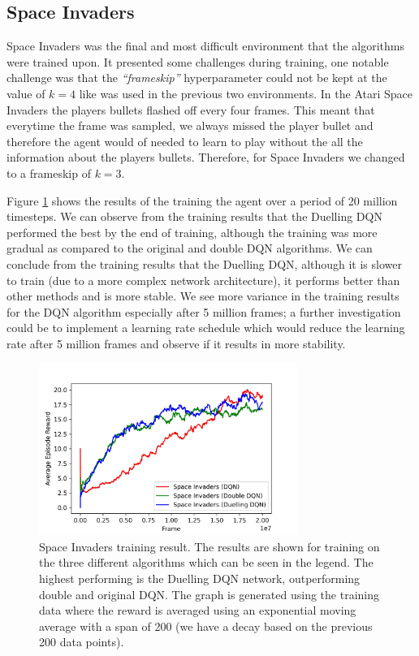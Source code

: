 \subsection{Space Invaders}
Space Invaders was the final and most difficult environment that the algorithms were trained upon. It presented some challenges during training, one notable challenge was that the \textit{``frameskip''} hyperparameter could not be kept at the value of $k = 4$ like was used in the previous two environments. In the Atari Space Invaders the players bullets flashed off every four frames. This meant that everytime the frame was sampled, we always missed the player bullet and therefore the agent would of needed to learn to play without the all the information about the players bullets. Therefore, for Space Invaders we changed to a frameskip of $k = 3$.

Figure \ref{fig:si-train-results} shows the results of the training the agent over a period of 20 million timesteps. We can observe from the training results that the Duelling DQN performed the best by the end of training, although the training was more gradual as compared to the original and double DQN algorithms. We can conclude from the training results that the Duelling DQN, although it is slower to train (due to a more complex network architecture), it performs better than other methods and is more stable. We see more variance in the training results for the DQN algorithm especially after 5 million frames; a further investigation could be to implement a learning rate schedule which would reduce the learning rate after 5 million frames and observe if it results in more stability.

\begin{figure}[htbp]
  \centering
  \includegraphics[width=0.75\textwidth]{chapters/chapter5/images/si_plot.jpg}
  \caption[Space Invaders training result plot]{Space Invaders training result. The results are shown for training on the three different algorithms which can be seen in the legend. The highest performing is the Duelling DQN network, outperforming double and original DQN. The graph is generated using the training data where the reward is averaged using an exponential moving average with a span of 200 (we have a decay based on the previous 200 data points).
    \label{fig:si-train-results}
  }
\end{figure}


